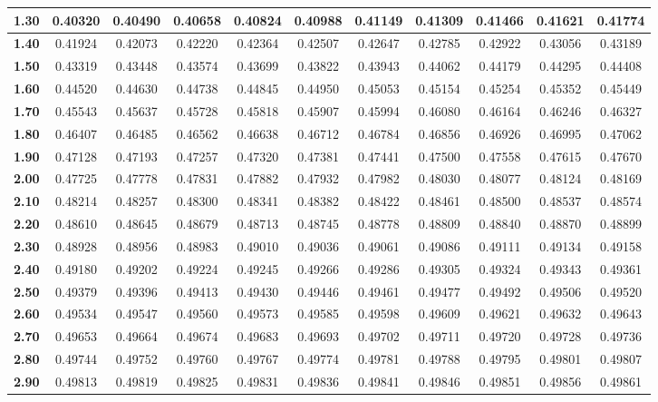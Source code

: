 \begin{tabular}{|c|c|c|c|c|c|c|c|c|c|c|}
\textbf{ 1.30 } & 0.40320 & 0.40490 & 0.40658 & 0.40824 & 0.40988 & 0.41149 & 0.41309 & 0.41466 & 0.41621 & 0.41774\\ 
\hline
\textbf{ 1.40 } & 0.41924 & 0.42073 & 0.42220 & 0.42364 & 0.42507 & 0.42647 & 0.42785 & 0.42922 & 0.43056 & 0.43189\\ 
\hline
\textbf{ 1.50 } & 0.43319 & 0.43448 & 0.43574 & 0.43699 & 0.43822 & 0.43943 & 0.44062 & 0.44179 & 0.44295 & 0.44408\\ 
\hline
\textbf{ 1.60 } & 0.44520 & 0.44630 & 0.44738 & 0.44845 & 0.44950 & 0.45053 & 0.45154 & 0.45254 & 0.45352 & 0.45449\\ 
\hline
\textbf{ 1.70 } & 0.45543 & 0.45637 & 0.45728 & 0.45818 & 0.45907 & 0.45994 & 0.46080 & 0.46164 & 0.46246 & 0.46327\\ 
\hline
\textbf{ 1.80 } & 0.46407 & 0.46485 & 0.46562 & 0.46638 & 0.46712 & 0.46784 & 0.46856 & 0.46926 & 0.46995 & 0.47062\\ 
\hline
\textbf{ 1.90 } & 0.47128 & 0.47193 & 0.47257 & 0.47320 & 0.47381 & 0.47441 & 0.47500 & 0.47558 & 0.47615 & 0.47670\\ 
\hline
\textbf{ 2.00 } & 0.47725 & 0.47778 & 0.47831 & 0.47882 & 0.47932 & 0.47982 & 0.48030 & 0.48077 & 0.48124 & 0.48169\\ 
\hline
\textbf{ 2.10 } & 0.48214 & 0.48257 & 0.48300 & 0.48341 & 0.48382 & 0.48422 & 0.48461 & 0.48500 & 0.48537 & 0.48574\\ 
\hline
\textbf{ 2.20 } & 0.48610 & 0.48645 & 0.48679 & 0.48713 & 0.48745 & 0.48778 & 0.48809 & 0.48840 & 0.48870 & 0.48899\\ 
\hline
\textbf{ 2.30 } & 0.48928 & 0.48956 & 0.48983 & 0.49010 & 0.49036 & 0.49061 & 0.49086 & 0.49111 & 0.49134 & 0.49158\\ 
\hline
\textbf{ 2.40 } & 0.49180 & 0.49202 & 0.49224 & 0.49245 & 0.49266 & 0.49286 & 0.49305 & 0.49324 & 0.49343 & 0.49361\\ 
\hline
\textbf{ 2.50 } & 0.49379 & 0.49396 & 0.49413 & 0.49430 & 0.49446 & 0.49461 & 0.49477 & 0.49492 & 0.49506 & 0.49520\\ 
\hline
\textbf{ 2.60 } & 0.49534 & 0.49547 & 0.49560 & 0.49573 & 0.49585 & 0.49598 & 0.49609 & 0.49621 & 0.49632 & 0.49643\\ 
\hline
\textbf{ 2.70 } & 0.49653 & 0.49664 & 0.49674 & 0.49683 & 0.49693 & 0.49702 & 0.49711 & 0.49720 & 0.49728 & 0.49736\\ 
\hline
\textbf{ 2.80 } & 0.49744 & 0.49752 & 0.49760 & 0.49767 & 0.49774 & 0.49781 & 0.49788 & 0.49795 & 0.49801 & 0.49807\\ 
\hline
\textbf{ 2.90 } & 0.49813 & 0.49819 & 0.49825 & 0.49831 & 0.49836 & 0.49841 & 0.49846 & 0.49851 & 0.49856 & 0.49861\\ 
\hline
\end{tabular} 

